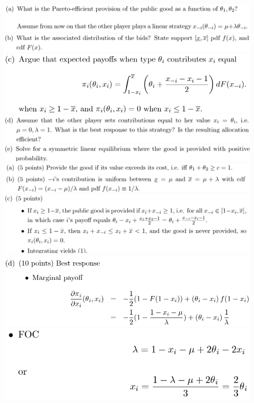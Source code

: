 \documentclass[8pt,landscape]{extarticle}
\begin{document}
\begin{multicols*}{3}
    \includegraphics[width=0.74\linewidth,keepaspectratio]{Screenshots/Screenshot 2024-03-11 135117.png}
    \includegraphics[width=0.74\linewidth,keepaspectratio]{Screenshots/Screenshot 2024-03-11 135121.png}
    \includegraphics[width=0.59\linewidth,keepaspectratio]{Screenshots/Screenshot 2024-03-11 135128.png}
    \includegraphics[width=0.74\linewidth,keepaspectratio]{Screenshots/Screenshot 2024-03-11 135133.png}
    \includegraphics[width=0.73\linewidth,keepaspectratio]{Screenshots/Screenshot 2024-03-11 135141.png}
    \includegraphics[width=0.75\linewidth,keepaspectratio]{Screenshots/Screenshot 2024-03-11 135150.png}
    \includegraphics[width=0.74\linewidth,keepaspectratio]{Screenshots/Screenshot 2024-03-11 135156.png}
    \includegraphics[width=0.64\linewidth,keepaspectratio]{Screenshots/Screenshot 2024-03-11 135202.png}
    \includegraphics[width=0.48\linewidth,keepaspectratio]{Screenshots/Screenshot 2024-03-11 135207.png}

\end{multicols*}
\end{document}
